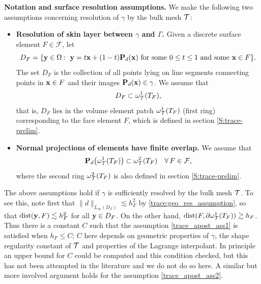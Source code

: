 \medskip\noindent
{\bf Notation and surface resolution assumptions.} %
%
We make the following two assumptions concerning resolution of $\gamma$ by the bulk mesh $\mathcal{T}$:
\begin{itemize}
\item {\bf Resolution of skin layer between $\gamma$ and $\Gamma$.}  Given a discrete surface element $F \in \mathcal{F}$, let 
$$D_F=\{{\bf y}\in\Omega: ~{\bf y}=t{\bf x}+(1-t) {\bf P}_d({\bf x}) \hbox{ for some } 0 \le t \le 1 \hbox{ and some } {\bf x} \in F\}.$$
The set $D_F$ is the collection of all points lying on line segments connecting points in ${\bf x} \in F$ and their images ${\bf P}_d({\bf x}) \in \gamma$.  We assume that
\begin{align}
\label{trace_apost_ass1}
D_F \subset \omega_{\mathcal{T}}^1(T_F),
\end{align}
that is, $D_F$ lies in the volume element patch $\omega_{\mathcal{T}}^1(T_F)$ (first ring) corresponding to the face element $F$, which is defined in section \ref{S:trace-prelim}.
%
\item{\bf Normal projections of elements have finite overlap.}
We assume that
\begin{align}
\label{trace_apost_ass2}
{\bf P}_d \big(\omega_{\mathcal{T}}^1(T_F) \big) \subset \omega_{\mathcal{T}}^2(T_F)
\quad\forall \, F \in \mathcal{F},
\end{align}
where the second ring $\omega_{\mathcal{T}}^2(T_F)$ is also defined in  section \ref{S:trace-prelim}.
\end{itemize}

The above assumptions hold if $\gamma$ is sufficiently resolved by the bulk mesh $\mathcal{T}$.  To see this, note first that $\|d\|_{L_\infty(D_F)} \lesssim h_F^2$ by \eqref{trace:geo_res_assumption}, so that ${\rm dist}({\bf y},F) \lesssim h_F^2$ for all ${\bf y} \in D_F$.  On the other hand, ${\rm dist}(F, \partial \omega_{\mathcal{T}}^1(T_F)) \gtrsim h_F$.  Thus there is a constant $C$ such that the assumption \eqref{trace_apost_ass1} is satisfied when $h_F \le C$;  $C$ here depends on geometric properties of $\gamma$, the shape regularity constant of $\mathcal{T}$ and properties of the Lagrange interpolant.  In principle an upper bound for $C$ could be computed and this condition checked, but this has not been attempted in the literature and we do not do so here.  A similar but more involved argument holds for the assumption \eqref{trace_apost_ass2}.

